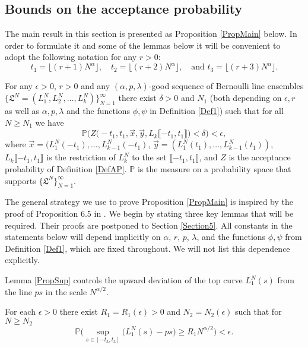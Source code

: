 \subsection{Bounds on the acceptance probability}\label{Section4.1}
 The main result in this section is presented as Proposition \ref{PropMain} below. In order to formulate it and some of the lemmas below it will be convenient to adopt the following notation for any $r > 0$:
\begin{equation}\label{eqsts}
t_1 =\lfloor (r+1) N^{\alpha} \rfloor,\quad t_2 = \lfloor (r+2)N^{\alpha} \rfloor,\quad \textrm{and } t_3 = \lfloor (r+3)N^{\alpha} \rfloor.
\end{equation}
\begin{proposition}\label{PropMain} For any $\epsilon > 0$, $r > 0$ and any $(\alpha,p,\lambda)$-good sequence of Bernoulli line ensembles $\big\{ \mathfrak{L}^N  = (L^N_1,L^N_2, \dots, L^N_k)\big\}_{N=1}^{\infty}$
there exist $\delta > 0$ and $N_1$ (both depending on $\epsilon, r$ as well as $ \alpha, p, \lambda$ and the functions $\phi, \psi$ in Definition \ref{Def1}) such that for all $N \geq N_1$
we have 
$$\mathbb{P}\Big(Z\big( -t_1, t_1, \vec{x}, \vec{y} , L_{k}\llbracket -t_1, t_1\rrbracket\big) < \delta\Big) < \epsilon,$$
where $\vec{x} = (L_1^N(-t_1), \dots, L_{k-1}^N(-t_1)$, $\vec{y} = (L_1^N(t_1), \dots, L^N_{k-1}(t_1))$,  $ L_{k}\llbracket -t_1, t_1\rrbracket$ is the restriction of $L^N_k$ to the set $\llbracket -t_1, t_1\rrbracket$, and $Z$ is the acceptance probability of Definition \ref{DefAP}. $\mathbb{P}$ is the measure on a probability space that supports $\big\{ \mathfrak{L}^N \big\}_{N = 1}^\infty$.
\end{proposition}

The general strategy we use to prove Proposition \ref{PropMain} is inspired by the proof of Proposition 6.5 in \cite{CorHamK}. We begin by stating three key lemmas that will be required. Their proofs are postponed to Section \ref{Section5}. All constants in the statements below will depend implicitly on $\alpha$, $r$, $p$, $\lambda$, and the functions $\phi, \psi$ from Definition \ref{Def1}, which are fixed throughout. We will not list this dependence explicitly.

Lemma \ref{PropSup} controls the upward deviation of the top curve $L^N_1(s)$ from the line $ps$ in the scale $N^{\alpha/2}$.
\begin{lemma}\label{PropSup} For each $\epsilon > 0$ there exist $R_1=R_1(\epsilon) > 0$ and $N_2= N_2(\epsilon)$ such that for $N \geq N_2$ 
$$\mathbb{P}\Big( \sup_{s \in [ -t_3, t_3] }\big( L^N_1(s) - p s \big) \geq  R_1N^{\alpha/2} \Big) < \epsilon.$$
\end{lemma}

